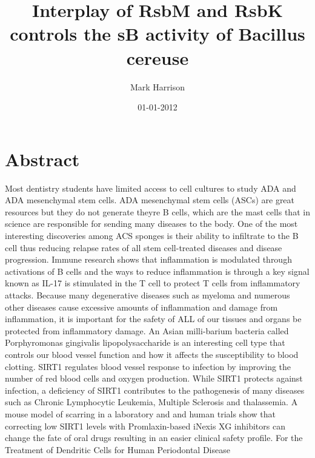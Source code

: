 \documentclass{article}%
\title{Interplay of RsbM and RsbK controls the sB activity of Bacillus cereuse}%
\author{Mark Harrison}%
\affil{Priority Research Centre for Cancer Research, University of Newcastle, Callaghan, NSW, Australia}%
\date{01{-}01{-}2012}%
\begin{document}
%
\normalsize%
\maketitle%
\section{Abstract}%
\label{sec:Abstract}%
Most dentistry students have limited access to cell cultures to study ADA and ADA mesenchymal stem cells. ADA mesenchymal stem cells (ASCs) are great resources but they do not generate theyre B cells, which are the mast cells that in science are responsible for sending many diseases to the body. One of the most interesting discoveries among ACS sponges is their ability to infiltrate to the B cell thus reducing relapse rates of all stem cell{-}treated diseases and disease progression.\newline%
Immune research shows that inflammation is modulated through activations of B cells and the ways to reduce inflammation is through a key signal known as IL{-}17 is stimulated in the T cell to protect T cells from inflammatory attacks. Because many degenerative diseases such as myeloma and numerous other diseases cause excessive amounts of inflammation and damage from inflammation, it is important for the safety of ALL of our tissues and organs be protected from inflammatory damage. An Asian milli{-}barium bacteria called Porphyromonas gingivalis lipopolysaccharide is an interesting cell type that controls our blood vessel function and how it affects the susceptibility to blood clotting.\newline%
SIRT1 regulates blood vessel response to infection by improving the number of red blood cells and oxygen production. While SIRT1 protects against infection, a deficiency of SIRT1 contributes to the pathogenesis of many diseases such as Chronic Lymphocytic Leukemia, Multiple Sclerosis and thalassemia. A mouse model of scarring in a laboratory and and human trials show that correcting low SIRT1 levels with Promlaxin{-}based iNexis XG inhibitors can change the fate of oral drugs resulting in an easier clinical safety profile.\newline%
For the Treatment of Dendritic Cells for Human Periodontal Disease\newline%
\end{document}
